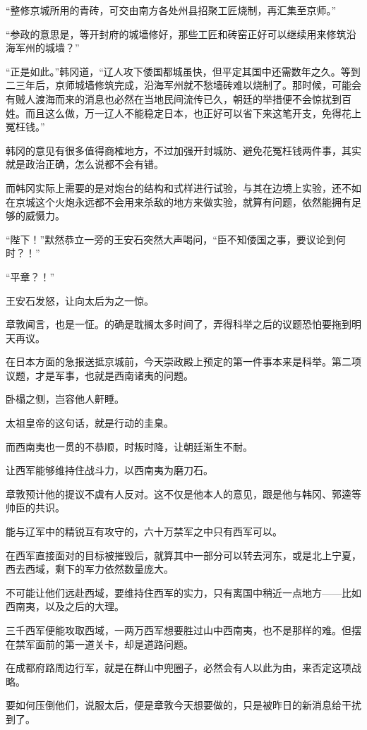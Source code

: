 “整修京城所用的青砖，可交由南方各处州县招聚工匠烧制，再汇集至京师。”

“参政的意思是，等开封府的城墙修好，那些工匠和砖窑正好可以继续用来修筑沿海军州的城墙？”

“正是如此。”韩冈道，“辽人攻下倭国都城虽快，但平定其国中还需数年之久。等到二三年后，京师城墙修筑完成，沿海军州就不愁墙砖难以烧制了。那时候，可能会有贼人渡海而来的消息也必然在当地民间流传已久，朝廷的举措便不会惊扰到百姓。而且这么做，万一辽人不能稳定日本，也正好可以省下来这笔开支，免得花上冤枉钱。”

韩冈的意见有很多值得商榷地方，不过加强开封城防、避免花冤枉钱两件事，其实就是政治正确，怎么说都不会有错。

而韩冈实际上需要的是对炮台的结构和式样进行试验，与其在边境上实验，还不如在京城这个火炮永远都不会用来杀敌的地方来做实验，就算有问题，依然能拥有足够的威慑力。

“陛下！”默然恭立一旁的王安石突然大声喝问，“臣不知倭国之事，要议论到何时？！”

“平章？！”

王安石发怒，让向太后为之一惊。

章敦闻言，也是一怔。的确是耽搁太多时间了，弄得科举之后的议题恐怕要拖到明天再议。

在日本方面的急报送抵京城前，今天崇政殿上预定的第一件事本来是科举。第二项议题，才是军事，也就是西南诸夷的问题。

卧榻之侧，岂容他人鼾睡。

太祖皇帝的这句话，就是行动的圭臬。

而西南夷也一贯的不恭顺，时叛时降，让朝廷渐生不耐。

让西军能够维持住战斗力，以西南夷为磨刀石。

章敦预计他的提议不虞有人反对。这不仅是他本人的意见，跟是他与韩冈、郭逵等帅臣的共识。

能与辽军中的精锐互有攻守的，六十万禁军之中只有西军可以。

在西军直接面对的目标被摧毁后，就算其中一部分可以转去河东，或是北上宁夏，西去西域，剩下的军力依然数量庞大。

不可能让他们远赴西域，要维持住西军的实力，只有离国中稍近一点地方——比如西南夷，以及之后的大理。

三千西军便能攻取西域，一两万西军想要胜过山中西南夷，也不是那样的难。但摆在禁军面前的第一道关卡，却是道路问题。

在成都府路周边行军，就是在群山中兜圈子，必然会有人以此为由，来否定这项战略。

要如何压倒他们，说服太后，便是章敦今天想要做的，只是被昨日的新消息给干扰到了。

